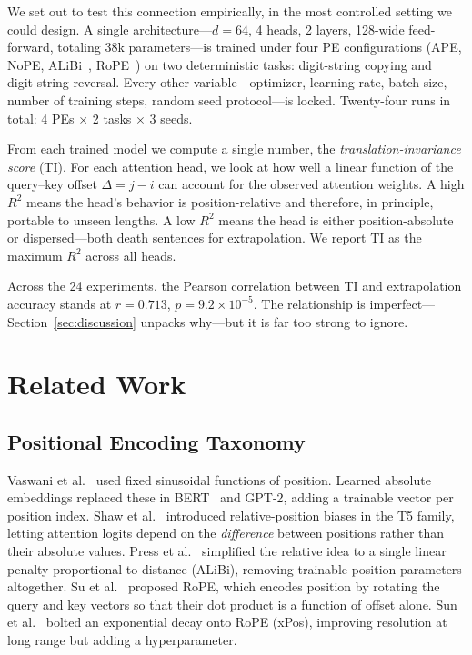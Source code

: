 \documentclass[10pt,twocolumn]{article}
\begin{document}
We set out to test this connection empirically, in the most controlled setting we could design.
A single architecture---$d{=}64$, 4 heads, 2 layers, 128-wide feed-forward, totaling 38k parameters---is trained under four PE configurations (APE, NoPE, ALiBi~\cite{press2022alibi}, RoPE~\cite{su2024roformer}) on two deterministic tasks: digit-string copying and digit-string reversal.
Every other variable---optimizer, learning rate, batch size, number of training steps, random seed protocol---is locked.
Twenty-four runs in total: 4 PEs $\times$ 2 tasks $\times$ 3 seeds.

From each trained model we compute a single number, the \emph{translation-invariance score} (TI).
For each attention head, we look at how well a linear function of the query--key offset $\Delta = j - i$ can account for the observed attention weights.
A high $R^2$ means the head's behavior is position-relative and therefore, in principle, portable to unseen lengths.
A low $R^2$ means the head is either position-absolute or dispersed---both death sentences for extrapolation.
We report TI as the maximum $R^2$ across all heads.

Across the 24 experiments, the Pearson correlation between TI and extrapolation accuracy stands at $r = 0.713$, $p = 9.2 \times 10^{-5}$.
The relationship is imperfect---Section~\ref{sec:discussion} unpacks why---but it is far too strong to ignore.

\section{Related Work}
\label{sec:related}

\subsection{Positional Encoding Taxonomy}

Vaswani et al.~\cite{vaswani2017attention} used fixed sinusoidal functions of position.
Learned absolute embeddings replaced these in BERT~\cite{devlin2019bert} and GPT-2, adding a trainable vector per position index.
Shaw et al.~\cite{shaw2018relative} introduced relative-position biases in the T5 family, letting attention logits depend on the \emph{difference} between positions rather than their absolute values.
Press et al.~\cite{press2022alibi} simplified the relative idea to a single linear penalty proportional to distance (ALiBi), removing trainable position parameters altogether.
Su et al.~\cite{su2024roformer} proposed RoPE, which encodes position by rotating the query and key vectors so that their dot product is a function of offset alone.
Sun et al.~\cite{sun2023length} bolted an exponential decay onto RoPE (xPos), improving resolution at long range but adding a hyperparameter.
\end{document}

